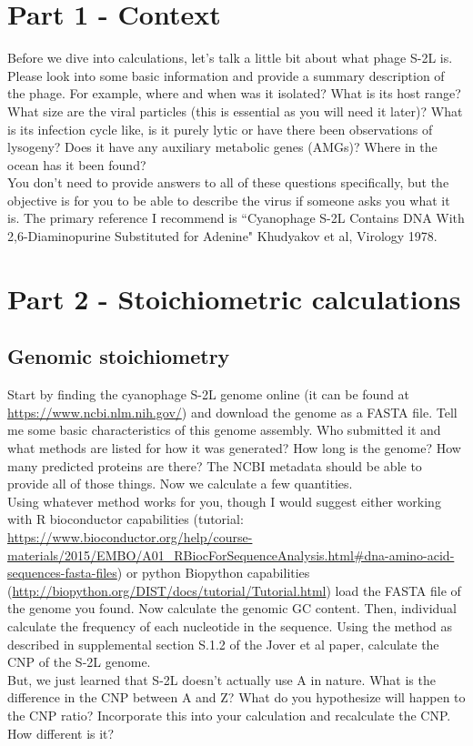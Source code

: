\documentclass[11pt]{amsart}
\begin{document}
\section{Part 1 - Context}
 Before we dive into calculations, let's talk a little bit about what phage S-2L is. Please look into some basic information and provide a summary description of the phage. For example, where and when was it isolated? What is its host range? What size are the viral particles (this is essential as you will need it later)? What is its infection cycle like, is it purely lytic or have there been observations of lysogeny? Does it have any auxiliary metabolic genes (AMGs)? Where in the ocean has it been found?\\
 You don't need to provide answers to all of these questions specifically, but the objective is for you to be able to describe the virus if someone asks you what it is. The primary reference I recommend is ``Cyanophage S-2L Contains DNA With 2,6-Diaminopurine Substituted for Adenine" Khudyakov et al, Virology 1978. 
\section{Part 2 - Stoichiometric calculations}
\subsection{Genomic stoichiometry}
 Start by finding the cyanophage S-2L genome online (it can be found at \url{https://www.ncbi.nlm.nih.gov/}) and download the genome as a FASTA file. Tell me some basic characteristics of this genome assembly. Who submitted it and what methods are listed for how it was generated? How long is the genome? How many predicted proteins are there? The NCBI metadata should be able to provide all of those things. Now we calculate a few quantities.\\
 Using whatever method works for you, though I would suggest either working with R bioconductor capabilities (tutorial: \url{https://www.bioconductor.org/help/course-materials/2015/EMBO/A01_RBiocForSequenceAnalysis.html#dna-amino-acid-sequences-fasta-files}) or python Biopython capabilities (\url{http://biopython.org/DIST/docs/tutorial/Tutorial.html}) load the FASTA file of the genome you found. Now calculate the genomic GC content. Then, individual calculate the frequency of each nucleotide in the sequence. Using the method as described in supplemental section S.1.2 of the Jover et al paper, calculate the CNP of the S-2L genome. \\
 But, we just learned that S-2L doesn't actually use A in nature. What is the difference in the CNP between A and Z? What do you hypothesize will happen to the CNP ratio? Incorporate this into your calculation and recalculate the CNP. How different is it? \\
\end{document}
